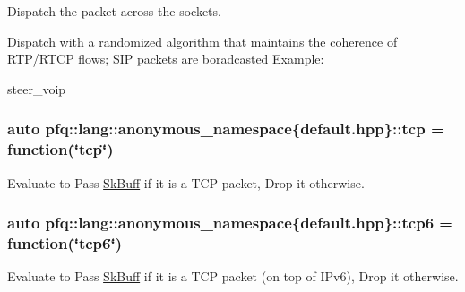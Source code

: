 Dispatch the packet across the sockets. 

Dispatch with a randomized algorithm that maintains the coherence of R\+T\+P/\+R\+T\+CP flows; S\+IP packets are boradcasted Example\+:

steer\+\_\+voip 
\subsubsection[{\texorpdfstring{tcp}{tcp}}]{\setlength{\rightskip}{0pt plus 5cm}auto pfq\+::lang\+::anonymous\+\_\+namespace\{default.\+hpp\}\+::tcp = {\bf function}(\char`\"{}tcp\char`\"{})}\hypertarget{namespacepfq_1_1lang_1_1anonymous__namespace_02default_8hpp_03_a5b8ca91a33a120e7e0807e63c8b51b28}{}\label{namespacepfq_1_1lang_1_1anonymous__namespace_02default_8hpp_03_a5b8ca91a33a120e7e0807e63c8b51b28}


Evaluate to {\ttfamily Pass} \hyperlink{structpfq_1_1lang_1_1SkBuff}{Sk\+Buff} if it is a T\+CP packet, {\ttfamily Drop} it otherwise. 

\subsubsection[{\texorpdfstring{tcp6}{tcp6}}]{\setlength{\rightskip}{0pt plus 5cm}auto pfq\+::lang\+::anonymous\+\_\+namespace\{default.\+hpp\}\+::tcp6 = {\bf function}(\char`\"{}tcp6\char`\"{})}\hypertarget{namespacepfq_1_1lang_1_1anonymous__namespace_02default_8hpp_03_ad5806a9b77c5975d08f0d0d317faa7a0}{}\label{namespacepfq_1_1lang_1_1anonymous__namespace_02default_8hpp_03_ad5806a9b77c5975d08f0d0d317faa7a0}


Evaluate to {\ttfamily Pass} \hyperlink{structpfq_1_1lang_1_1SkBuff}{Sk\+Buff} if it is a T\+CP packet (on top of I\+Pv6), {\ttfamily Drop} it otherwise. 

